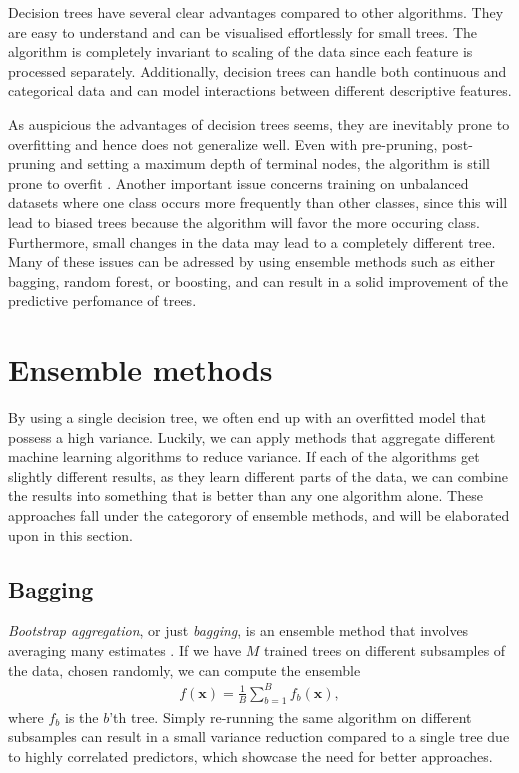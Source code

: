 Decision trees have several clear advantages compared to other algorithms. They are easy to understand and can be visualised effortlessly for small trees. The algorithm is completely invariant to scaling of the data since each feature is processed separately. Additionally, decision trees can handle both continuous and categorical data and can model interactions between different descriptive features.

As auspicious the advantages of decision trees seems, they are inevitably prone to overfitting and hence does not generalize well. Even with pre-pruning, post-pruning and setting a maximum depth of terminal nodes, the algorithm is still prone to overfit \cite{Guido2016}. Another important issue concerns training on unbalanced datasets where one class occurs more frequently than other classes, since this will lead to biased trees because the algorithm will favor the more occuring class. Furthermore, small changes in the data may lead to a completely different tree. Many of these issues can be adressed by using ensemble methods such as either bagging, random forest, or boosting, and can result in a solid improvement of the predictive perfomance of trees.

\section{Ensemble methods}

By using a single decision tree, we often end up with an overfitted model that possess a high variance. Luckily, we can apply methods that aggregate different machine learning algorithms to reduce variance. If each of the algorithms get slightly different results, as they learn different parts of the data, we can combine the results into something that is better than any one algorithm alone. These approaches fall under the categorory of ensemble methods, and will be elaborated upon in this section. %

\subsection{Bagging}

\textit{Bootstrap aggregation}, or just \textit{bagging}, is an ensemble method that involves averaging many estimates \cite{Murphy2012}. If we have $M$ trained trees on different subsamples of the data, chosen randomly, we can compute the ensemble
\begin{align}
  f(\boldsymbol{x}) = \frac{1}{B} \sum_{b=1}^B f_b(\boldsymbol{x}),
\end{align}
where $f_b$ is the $b$'th tree. Simply re-running the same algorithm on different subsamples can result in a small variance reduction compared to a single tree due to highly correlated predictors, which showcase the need for better approaches.

